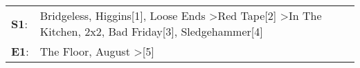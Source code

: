 \begin{supertabular}{p{0.03\textwidth}p{0.92\textwidth}}
 \textbf{S1}:  &  Bridgeless\textsuperscript{}, \enspace Higgins[1]\textsuperscript{}, \enspace Loose Ends\textsuperscript{} \textgreater \enspace Red Tape[2]\textsuperscript{} \textgreater \enspace In The Kitchen\textsuperscript{}, \enspace 2x2\textsuperscript{}, \enspace Bad Friday[3]\textsuperscript{}, \enspace Sledgehammer[4]\textsuperscript{}  \enspace  \\
 \textbf{E1}:  &                                                                                                                                                                                                                               The Floor\textsuperscript{}, \enspace August\textsuperscript{} \textgreater {}[5]\textsuperscript{}  \enspace  \\
\end{supertabular}
